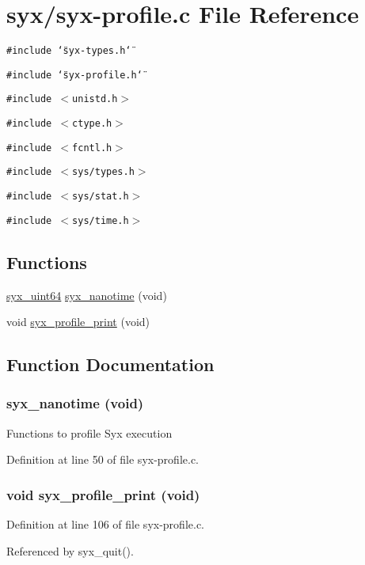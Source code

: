\hypertarget{syx-profile_8c}{
\section{syx/syx-profile.c File Reference}
\label{syx-profile_8c}
}
{\tt \#include \char`\"{}syx-types.h\char`\"{}}\par
{\tt \#include \char`\"{}syx-profile.h\char`\"{}}\par
{\tt \#include $<$unistd.h$>$}\par
{\tt \#include $<$ctype.h$>$}\par
{\tt \#include $<$fcntl.h$>$}\par
{\tt \#include $<$sys/types.h$>$}\par
{\tt \#include $<$sys/stat.h$>$}\par
{\tt \#include $<$sys/time.h$>$}\par
\subsection*{Functions}
\begin{CompactItemize}
\item 
\hyperlink{syx-types_8h_5a7750bec2122e7d3fccdffa19e87efe}{syx\_\-uint64} \hyperlink{syx-profile_8c_7abf236f7fed83725a693fd68dc1262c}{syx\_\-nanotime} (void)
\item 
void \hyperlink{syx-profile_8c_557c65d8649d22114e7adc30fc32e652}{syx\_\-profile\_\-print} (void)
\end{CompactItemize}


\subsection{Function Documentation}
\hypertarget{syx-profile_8c_7abf236f7fed83725a693fd68dc1262c}{
\subsubsection{ syx\_\-nanotime (void)}}
\label{syx-profile_8c_7abf236f7fed83725a693fd68dc1262c}


Functions to profile Syx execution 

Definition at line 50 of file syx-profile.c.\hypertarget{syx-profile_8c_557c65d8649d22114e7adc30fc32e652}{
\subsubsection{\setlength{\rightskip}{0pt plus 5cm}void syx\_\-profile\_\-print (void)}}
\label{syx-profile_8c_557c65d8649d22114e7adc30fc32e652}




Definition at line 106 of file syx-profile.c.

Referenced by syx\_\-quit().